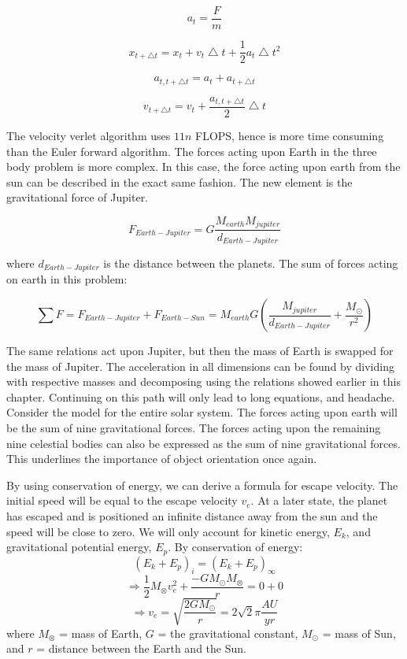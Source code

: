 \documentclass[10pt,a4paper]{article}
\begin{document}
$$a_t=\frac{F}{m}$$

$$x_{t+\bigtriangleup t}=x_t + v_t\bigtriangleup t +\frac{1}{2} a_t\bigtriangleup t^2$$

$$a_{t,t+\bigtriangleup t}=a_t + a_{t+\bigtriangleup t}$$

$$v_{t+\bigtriangleup t}=v_t + \frac{a_{t,t+\bigtriangleup t}}{2}\bigtriangleup t$$

\noindent The velocity verlet algorithm uses $11n$ FLOPS, hence is more time consuming than the Euler forward algorithm. The forces acting upon Earth in the three body problem is more complex. In this case, the force acting upon earth from the sun can be described in the exact same fashion. The new element is the gravitational force of Jupiter. 

$$F_{Earth-Jupiter}=G\frac{M_{earth}M_{jupiter}}{d_{Earth-Jupiter}}$$

\noindent where $d_{Earth-Jupiter}$ is the distance between the planets. The sum of forces acting on earth in this problem: 

$$\sum F = F_{Earth-Jupiter}+ F_{Earth-Sun}= M_{earth}G(\frac{M_{jupiter}}{d_{Earth-Jupiter}} + \frac{M_{\odot}}{r^2}) $$

\noindent The same relations act upon Jupiter, but then the mass of Earth is swapped for the mass of Jupiter. The acceleration in all dimensions can be found by dividing with respective masses and decomposing using the relations showed earlier in this chapter. Continuing on this path will only lead to long equations, and headache. Consider the model for the entire solar system. The forces acting upon earth will be the sum of nine gravitational forces. The forces acting upon the remaining nine celestial bodies can also be expressed as the sum of nine gravitational forces. This underlines the importance of object orientation once again.

\noindent By using conservation of energy, we can derive a formula for escape velocity. The initial speed will be equal to the escape velocity $v_e$. At a later state, the planet has escaped and is positioned an infinite distance away from the sun and the speed will be close to zero. We will only account for kinetic energy, $E_k$, and gravitational potential energy, $E_p$. By conservation of energy: 
$$(E_k+E_p)_i = (E_k+E_p)_{\infty}$$
$$\Rightarrow \frac{1}{2}M_{\otimes}v_e^2 + \frac{-GM_{\odot}M_{\otimes}}{r} = 0 + 0$$
$$\Rightarrow v_e = \sqrt{\frac{2GM_{\odot}}{r}} = 2\sqrt{2}\pi \frac{AU}{yr}$$
where $M_{\otimes}$ = mass of Earth, $G$ = the gravitational constant, $M_{\odot}$ = mass of Sun, and $r$ = distance between the Earth and the Sun.
\end{document}
